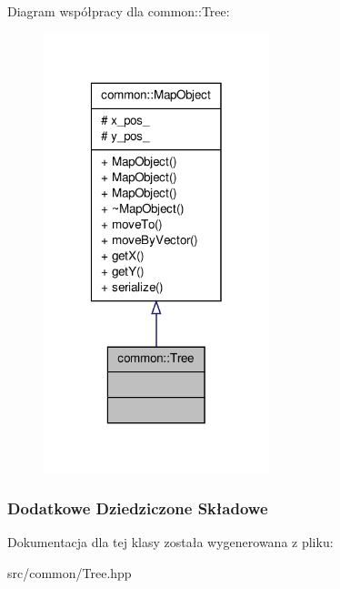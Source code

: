 Diagram współpracy dla common\-:\-:Tree\-:
\nopagebreak
\begin{figure}[H]
\begin{center}
\leavevmode
\includegraphics[width=186pt]{classcommon_1_1Tree__coll__graph}
\end{center}
\end{figure}
\subsubsection*{Dodatkowe Dziedziczone Składowe}


Dokumentacja dla tej klasy została wygenerowana z pliku\-:\begin{DoxyCompactItemize}
\item 
src/common/Tree.\-hpp\end{DoxyCompactItemize}
